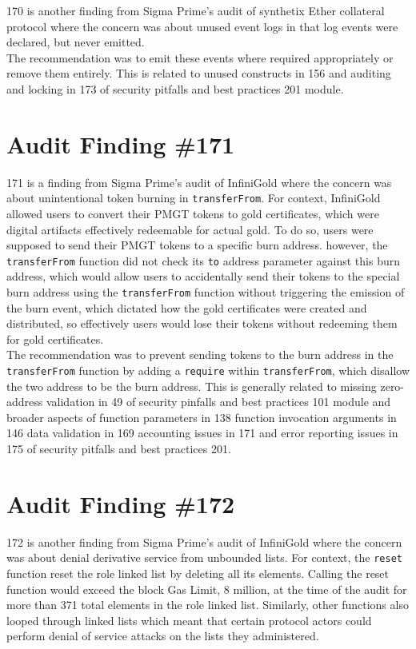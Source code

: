 170 is another finding from Sigma Prime's audit of synthetix Ether collateral protocol where the concern was about unused event logs in that log events were declared, but never emitted.\\ 

The recommendation was to emit these events where required appropriately or remove them entirely. This is related to unused constructs in 156 and auditing and locking in 173 of security pitfalls and best practices 201 module.

\section{Audit Finding \#171}

171 is a finding from Sigma Prime's audit of InfiniGold where the concern was about unintentional token burning in \verb|transferFrom|. For context, InfiniGold allowed users to convert their PMGT tokens to gold certificates, which were digital artifacts effectively redeemable for actual gold. To do so, users were supposed to send their PMGT tokens to a specific burn address. however, the \verb|transferFrom| function did not check its \verb|to| address parameter against this burn address, which would allow users to accidentally send their tokens to the special burn address using the \verb|transferFrom| function without triggering the emission of the burn event, which dictated how the gold certificates were created and distributed, so effectively users would lose their tokens without redeeming them for gold certificates.\\

The recommendation was to prevent sending tokens to the burn address in the \verb|transferFrom| function by adding a \verb|require| within \verb|transferFrom|, which disallow the two address to be the burn address. This is generally related to missing zero-address validation in 49 of security pinfalls and best practices 101 module and broader aspects of function parameters in 138 function invocation arguments in 146 data validation in 169 accounting issues in 171 and error reporting issues in 175 of security pitfalls and best practices 201.

\section{Audit Finding \#172}

172 is another finding from Sigma Prime's audit of InfiniGold where the concern was about denial derivative service from unbounded lists. For context, the \verb|reset| function reset the role linked list by deleting all its elements. Calling the reset function would exceed the block Gas Limit, 8 million, at the time of the audit for more than 371 total elements in the role linked list. Similarly, other functions also looped through linked lists which meant that certain protocol actors could perform denial of service attacks on the lists they administered.\\

